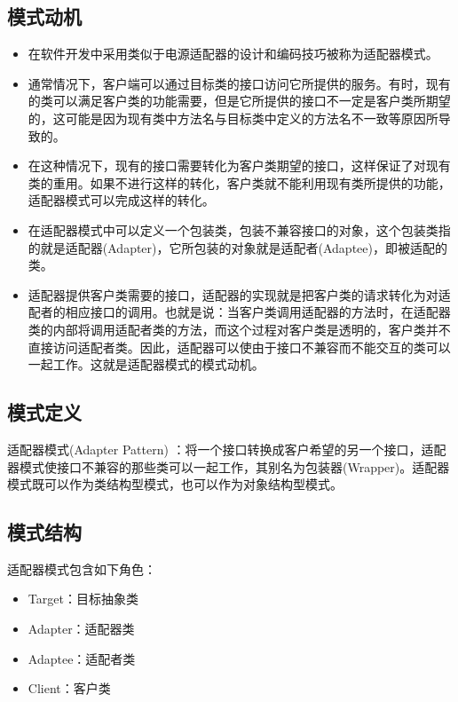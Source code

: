 \documentclass[letterpaper,10pt,english]{sphinxmanual}
\begin{document}
\subsection{模式动机}
\label{\detokenize{structural_patterns/adapter:id3}}\begin{itemize}
\item {} 
\sphinxAtStartPar
在软件开发中采用类似于电源适配器的设计和编码技巧被称为适配器模式。

\item {} 
\sphinxAtStartPar
通常情况下，客户端可以通过目标类的接口访问它所提供的服务。有时，现有的类可以满足客户类的功能需要，但是它所提供的接口不一定是客户类所期望的，这可能是因为现有类中方法名与目标类中定义的方法名不一致等原因所导致的。

\item {} 
\sphinxAtStartPar
在这种情况下，现有的接口需要转化为客户类期望的接口，这样保证了对现有类的重用。如果不进行这样的转化，客户类就不能利用现有类所提供的功能，适配器模式可以完成这样的转化。

\item {} 
\sphinxAtStartPar
在适配器模式中可以定义一个包装类，包装不兼容接口的对象，这个包装类指的就是适配器(Adapter)，它所包装的对象就是适配者(Adaptee)，即被适配的类。

\item {} 
\sphinxAtStartPar
适配器提供客户类需要的接口，适配器的实现就是把客户类的请求转化为对适配者的相应接口的调用。也就是说：当客户类调用适配器的方法时，在适配器类的内部将调用适配者类的方法，而这个过程对客户类是透明的，客户类并不直接访问适配者类。因此，适配器可以使由于接口不兼容而不能交互的类可以一起工作。这就是适配器模式的模式动机。

\end{itemize}


\subsection{模式定义}
\label{\detokenize{structural_patterns/adapter:id4}}
\sphinxAtStartPar
适配器模式(Adapter Pattern) ：将一个接口转换成客户希望的另一个接口，适配器模式使接口不兼容的那些类可以一起工作，其别名为包装器(Wrapper)。适配器模式既可以作为类结构型模式，也可以作为对象结构型模式。


\subsection{模式结构}
\label{\detokenize{structural_patterns/adapter:id5}}
\sphinxAtStartPar
适配器模式包含如下角色：
\begin{itemize}
\item {} 
\sphinxAtStartPar
Target：目标抽象类

\item {} 
\sphinxAtStartPar
Adapter：适配器类

\item {} 
\sphinxAtStartPar
Adaptee：适配者类

\item {} 
\sphinxAtStartPar
Client：客户类

\end{itemize}
\end{document}
